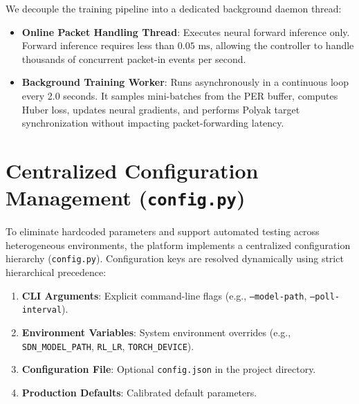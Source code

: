 \documentclass[12pt,a4paper,oneside]{report}
\begin{document}
We decouple the training pipeline into a dedicated background daemon thread:
\begin{itemize}
    \item \textbf{Online Packet Handling Thread}: Executes neural forward inference only. Forward inference requires less than $0.05\text{ ms}$, allowing the controller to handle thousands of concurrent packet-in events per second.
    \item \textbf{Background Training Worker}: Runs asynchronously in a continuous loop every 2.0 seconds. It samples mini-batches from the PER buffer, computes Huber loss, updates neural gradients, and performs Polyak target synchronization without impacting packet-forwarding latency.
\end{itemize}

\section{Centralized Configuration Management (\texttt{config.py})}
To eliminate hardcoded parameters and support automated testing across heterogeneous environments, the platform implements a centralized configuration hierarchy (\texttt{config.py}). Configuration keys are resolved dynamically using strict hierarchical precedence:
\begin{enumerate}
    \item \textbf{CLI Arguments}: Explicit command-line flags (e.g., \texttt{--model-path}, \texttt{--poll-interval}).
    \item \textbf{Environment Variables}: System environment overrides (e.g., \texttt{SDN\_MODEL\_PATH}, \texttt{RL\_LR}, \texttt{TORCH\_DEVICE}).
    \item \textbf{Configuration File}: Optional \texttt{config.json} in the project directory.
    \item \textbf{Production Defaults}: Calibrated default parameters.
\end{enumerate}
\end{document}
